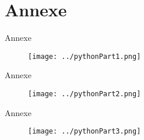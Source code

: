 \documentclass{beamer}
\begin{document}
\section{Annexe}
  \begin{frame}{Annexe}
    \begin{figure}
      \begin{center}
        \texttt{[image: ../pythonPart1.png]} 
      \end{center}
    \end{figure}
  \end{frame}

  \begin{frame}{Annexe}
    \begin{figure}
      \begin{center}
        \texttt{[image: ../pythonPart2.png]} 
      \end{center}
    \end{figure}
  \end{frame}

  \begin{frame}{Annexe}
    \begin{figure}
      \begin{center}
        \texttt{[image: ../pythonPart3.png]} 
      \end{center}
    \end{figure}
  \end{frame}
\end{document}
